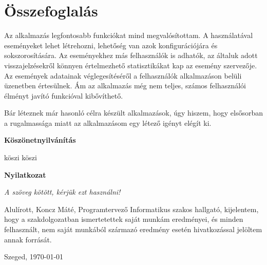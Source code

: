 \documentclass[a4paper,12pt]{report}
\theoremstyle{definition}
\theoremstyle{remark}
\begin{document}
\chapter{Összefoglalás}

Az alkalmazás legfontosabb funkciókat mind megvalósítottam. A használatával eseményeket lehet létrehozni, lehetőség van azok konfigurációjára és sokszorosítására. Az eseményekhez más felhasználók is adhatók, az általuk adott visszajelzésekről könnyen értelmezhető statisztikákat kap az esemény szervezője. Az események adatainak véglegesítéséről a felhasználók alkalmazáson belüli üzenetben értesülnek. Ám az alkalmazás még nem teljes, számos felhasználói élményt javító funkcióval kibővíthető.

Bár léteznek már hasonló célra készült alkalmazások, úgy hiszem, hogy elsősorban a rugalmassága miatt az alkalmazásom egy létező igényt elégít ki.

\newpage


 

\newpage
{\Huge \bf Köszönetnyilvánítás}


\vspace{2 cm}

köszi köszi

\newpage
{\Huge \bf Nyilatkozat}


\vspace{2 cm}

{\it A szöveg kötött, kérjük ezt használni!}

Alulírott, Koncz Máté, Programtervező Informatikus szakos hallgató, kijelentem, hogy a szakdolgozatban ismertetettek saját munkám eredményei, és minden felhasznált, nem saját munkából származó eredmény esetén hivatkozással jelöltem annak forrását. 


\begin{flushleft}
\vspace*{1cm}
Szeged, \today
\end{flushleft}

\begin{flushright}
 \vspace*{1cm}
 \makebox[7cm]{\rule{6cm}{.4pt}}\\
\end{flushright}

\pagebreak
\end{document}
